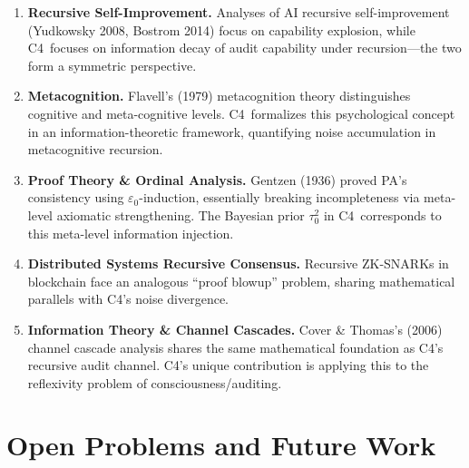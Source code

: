 \documentclass[12pt,a4paper]{article}
\theoremstyle{definition}
\newcommand{\Cfour}{\textsc{C4}}
\begin{document}
\begin{enumerate}[leftmargin=*, label=\arabic*.]
    \item \textbf{Recursive Self-Improvement.} Analyses of AI recursive self-improvement (Yudkowsky 2008, Bostrom 2014) focus on capability explosion, while \Cfour\ focuses on information decay of audit capability under recursion---the two form a symmetric perspective.

    \item \textbf{Metacognition.} Flavell's (1979) metacognition theory distinguishes cognitive and meta-cognitive levels. \Cfour\ formalizes this psychological concept in an information-theoretic framework, quantifying noise accumulation in metacognitive recursion.

    \item \textbf{Proof Theory \& Ordinal Analysis.} Gentzen (1936) proved PA's consistency using $\varepsilon_0$-induction, essentially breaking incompleteness via meta-level axiomatic strengthening. The Bayesian prior $\tau_0^2$ in \Cfour\ corresponds to this meta-level information injection.

    \item \textbf{Distributed Systems Recursive Consensus.} Recursive ZK-SNARKs in blockchain face an analogous ``proof blowup'' problem, sharing mathematical parallels with \Cfour's noise divergence.

    \item \textbf{Information Theory \& Channel Cascades.} Cover \& Thomas's (2006) channel cascade analysis shares the same mathematical foundation as \Cfour's recursive audit channel. \Cfour's unique contribution is applying this to the reflexivity problem of consciousness/auditing.
\end{enumerate}

\section{Open Problems and Future Work}
\end{document}
